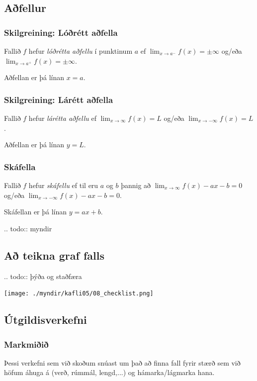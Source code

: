 \documentclass[icelandic,a4paper,12pt]{article}
\begin{document}
\subsection{Aðfellur}
\subsubsection{Skilgreining: Lóðrétt aðfella}
Fallið $f$ hefur \emph{lóðrétta aðfellu} í punktinum $a$ ef 
$\lim_{x\to a^-} f(x) = \pm \infty$ og/eða
$\lim_{x\to a^+} f(x) = \pm \infty$.

Aðfellan er þá línan $x=a$.

\subsubsection{Skilgreining: Lárétt aðfella}
Fallið $f$ hefur \emph{lárétta aðfellu} ef
$\lim_{x\to \infty} f(x) = L$ og/eða
$\lim_{x\to -\infty} f(x) = L$.

Aðfellan er þá línan $y=L$.

\subsubsection{Skáfella}
Fallið $f$ hefur \emph{skáfellu} ef til eru $a$ og $b$ þannig að
$\lim_{x\to \infty} f(x) -ax-b = 0$ og/eða
$\lim_{x\to -\infty} f(x) -ax-b= 0$.

Skáfellan er þá línan $y=ax+b$.

.. todo:: myndir

\subsection{Að teikna graf falls}

.. todo:: þýða og staðfæra

 \begin{center}
 \texttt{[image: ./myndir/kafli05/08\_checklist.png]}
 \end{center}
 

\subsection{Útgildisverkefni}
\subsubsection{Markmiðið}
Þessi verkefni sem við skoðum snúast um það að finna
fall fyrir stærð sem við höfum áhuga á 
(verð, rúmmál, lengd,...) og hámarka/lágmarka hana.
 
\end{document}
